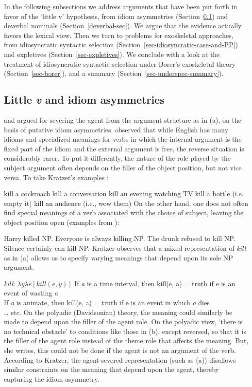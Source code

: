 In the following subsections we address arguments that have been put forth in favor of the `little v'
hypothesis, from idiom asymmetries (Section~\ref{idiom-asym}) and deverbal nominals
(Section~\ref{deverbal-sec}).  We argue that the evidence actually favors the lexical view.  Then we
turn to problems for exoskeletal approaches, from idiosyncratic syntactic selection
(Section~\ref{sec-idiosyncratic-case-and-PP}) and expletives (Section~\ref{sec-expletives}).  We
conclude with a look at the treatment of idiosyncratic syntactic selection under Borer's exoskeletal theory (Section~\ref{sec-borer}), and a summary
(Section~\ref{sec-underspec-summary}).

\subsection{Little \emph{v} and idiom asymmetries}
\label{idiom-asym}

\mbox{}\citet{Marantz84a} and \citet{Kratzer96a} argued for severing the agent from the argument structure as in (a), on the basis of putative idiom asymmetries.
\citet{Marantz84a} observed that while English has many idioms and specialized meanings for verbs in
which the internal argument is the fixed part of the idiom and the external argument is free, the
reverse situation is considerably rarer. To put it differently, the nature of the role played by the
subject argument often depends on the filler of the object position, but not vice versa. To take
Kratzer's examples \citep[]{Kratzer96a}: 

\eal
\ex kill a cockroach
\ex kill a conversation
\ex kill an evening watching TV 
\ex kill a bottle (i.e. empty it) 
\ex kill an audience (i.e., wow them)
\zl
On the other hand, one does not often find special meanings of a verb associated with the choice of subject, leaving the object position open (examples from ):

\eal
\ex Harry killed NP.
\ex Everyone is always killing NP. 
\ex The drunk refused to kill NP. 
\ex Silence certainly can kill NP.
\zl
Kratzer observes that a mixed representation of \emph{kill} as in (a) allows us to specify varying meanings that depend upon its sole NP argument.  

\eal
\ex \emph{kill}: $\lambda y\lambda e[kill(e, y)]$ 
\ex If \emph{a} is a time interval, then kill(e, a) = truth if e is an event of wasting \emph{a} \\
If \emph{a} is animate, then kill(e, a) = truth if e is an event in which \emph{a} dies \\
\ldots{} etc.
\zl
On the polyadic (Davidsonian) theory, the meaning could similarly be made to depend upon the filler of the agent role.  On the polyadic view, `there is no technical obstacle' \citep[]{Kratzer96a} to conditions like those in (b), except reversed, so that it is the filler of the agent role instead of the theme role that affects the meaning.  But, she writes, this could not be done if the agent is not an argument of the verb.  According to Kratzer, the agent-severed representation (such as (a)) disallows similar constraints on the meaning that depend upon the agent, thereby capturing the idiom asymmetry.  

